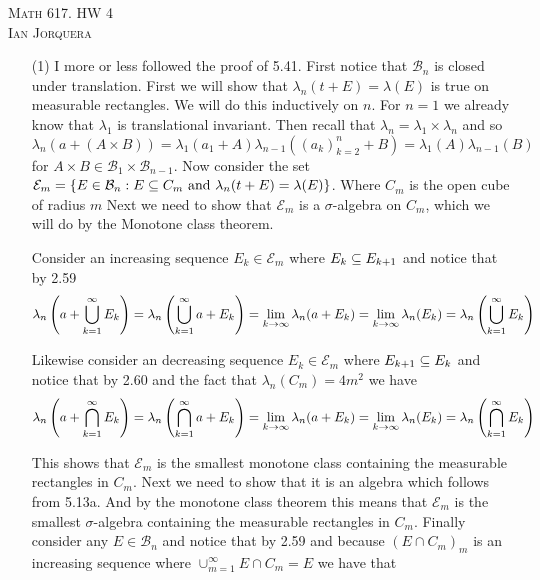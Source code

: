 \documentclass[12pt]{amsart}
\begin{document}
\begin{center}
   \textsc{Math 617. HW 4\\ Ian Jorquera}
\end{center}
\vspace{1em}

\begin{itemize}
   \item[(1)] %
   I more or less followed the proof of 5.41. First notice that $\mathcal B_n$ is closed under translation. %
   First we will show that $\lambda_n(t+E)=\lambda(E)$ is true on measurable rectangles. We will do this 
   inductively on $n$. For $n=1$ we already know that $\lambda_1$ is translational invariant.
   Then recall that $\lambda_n=\lambda_1\times\lambda_n$ and so 
   $\lambda_n(a+(A\times B))=\lambda_1(a_1+A)\lambda_{n-1}((a_k)_{k=2}^n + B)=\lambda_1(A)\lambda_{n-1}(B)$
   for $A\times B\in \mathcal B_1\times \mathcal B_{n-1}$. 
   Now consider the set $\mathcal E_m = \{E\in\mathcal B_n : E\subseteq C_m\text{ and }\lambda_n(t+E)=\lambda(E)\}$.  
   Where $C_m$ is the open cube of radius $m$
   Next we need to show that 
   $\mathcal E_m$ is a $\sigma$-algebra on $C_m$, which we will do by the Monotone class theorem.

   Consider an increasing sequence $E_k\in\mathcal E_m$ where $E_k\subseteq E_{k+1}$ and notice that
   by 2.59 \[\lambda_n\left(a+\bigcup_{k=1}^\infty E_k\right)=\lambda_n\left(\bigcup_{k=1}^\infty a+E_k\right)=\lim_{k\rightarrow\infty}\lambda_n(a+E_k)=\lim_{k\rightarrow\infty}\lambda_n(E_k)=\lambda_n\left(\bigcup_{k=1}^\infty E_k\right)\]

   Likewise consider an decreasing sequence $E_k\in\mathcal E_m$ where $E_{k+1}\subseteq E_{k}$ and notice that
   by 2.60 and the fact that $\lambda_n(C_m)=4m^2$ we have
   \[\lambda_n\left(a+\bigcap_{k=1}^\infty E_k\right)=\lambda_n\left(\bigcap_{k=1}^\infty a+E_k\right)=\lim_{k\rightarrow\infty}\lambda_n(a+E_k)=\lim_{k\rightarrow\infty}\lambda_n(E_k)=\lambda_n\left(\bigcap_{k=1}^\infty E_k\right)\]

   This shows that $\mathcal E_m$ is the smallest monotone class containing the measurable rectangles in $C_m$. 
   Next we need to show that it is an algebra which follows from 5.13a.
   And by the monotone class theorem this means that $\mathcal E_m$ is the smallest 
   $\sigma$-algebra containing the measurable rectangles in $C_m$. Finally consider 
   any $E\in \mathcal B_n$ and notice that by 2.59 and because $(E\cap C_m)_{m}$ 
   is an increasing sequence where $\cup_{m=1}^\infty E\cap C_m=E$ we have that


\end{itemize}
\end{document}
